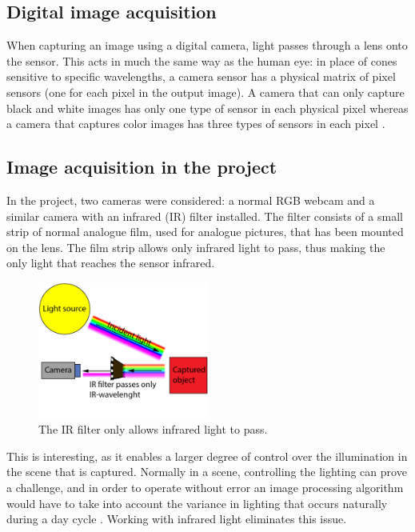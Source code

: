 \subsection{Digital image acquisition}
When capturing an image using a digital camera, light passes through a lens onto the sensor. This acts in much the same way as the human eye: in place of cones sensitive to specific wavelengths, a camera sensor has a physical matrix of pixel sensors (one for each pixel in the output image). A camera that can only capture black and white images has only one type of sensor in each physical pixel whereas a camera that captures color images has three types of sensors in each pixel \citep{ip_book}.



\subsection{Image acquisition in the project}
In the project, two cameras were considered: a normal RGB webcam and a similar camera with an infrared (IR) filter installed. The filter consists of a small strip of normal analogue film, used for analogue pictures, that has been mounted on the lens. The film strip allows only infrared light to pass, thus making the only light that reaches the sensor infrared.

\begin{figure}[htbp] 
\centering 
\includegraphics[width=0.5\textwidth]{Pictures/Theory/IR_filter.png} 
\caption{The IR filter only allows infrared light to pass.} 
\label{fig:ir_filter} 
\end{figure}

This is interesting, as it enables a larger degree of control over the illumination in the scene that is captured. Normally in a scene, controlling the lighting can prove a challenge, and in order to operate without error an image processing algorithm would have to take into account the variance in lighting that occurs naturally during a day cycle \citep{ip_book}. Working with infrared light eliminates this issue.


